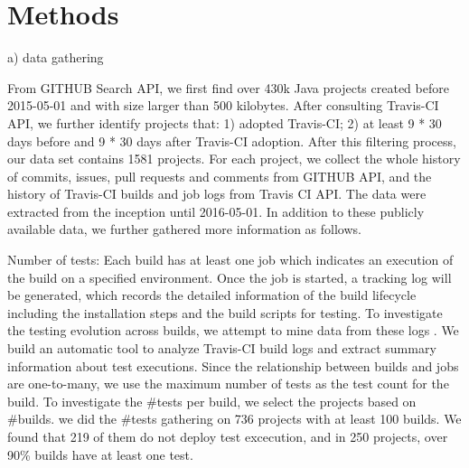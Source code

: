 \section{Methods}
\label{sec:method}

a) data gathering

From GITHUB Search API, we first find over 430k Java projects created before 2015-05-01 and with size larger than 500 kilobytes. After consulting Travis-CI API, we further identify projects that: 1) adopted Travis-CI; 2) at least 9 * 30 days before and 9 * 30 days after Travis-CI adoption. After this filtering process, our data set contains 1581 projects.  
For each project, we collect the whole history of commits, issues, pull requests and comments from GITHUB API, and the history of Travis-CI builds and job logs from Travis CI API.  The data were extracted from the inception until 2016-05-01. 
In addition to these publicly available data, we further gathered more information as follows.

Number of tests: 
Each build has at least one job which indicates an execution of the build on a specified environment. Once the job is started, a tracking log will be generated, which records the detailed information of the build lifecycle including the installation steps and the build scripts for testing. To investigate the testing evolution across builds, we attempt to mine data from these logs . We build an automatic tool to analyze Travis-CI build logs and extract summary information about test executions. 
Since the relationship between builds and jobs are one-to-many, we use the maximum number of tests as the test count for the build. 
To investigate the \#tests per build, we select the projects based on \#builds.  we did the \#tests gathering on 736 projects with at least 100 builds. We found that 219 of them do not deploy test excecution, and in 250 projects, over 90\% builds have at least one test. 

